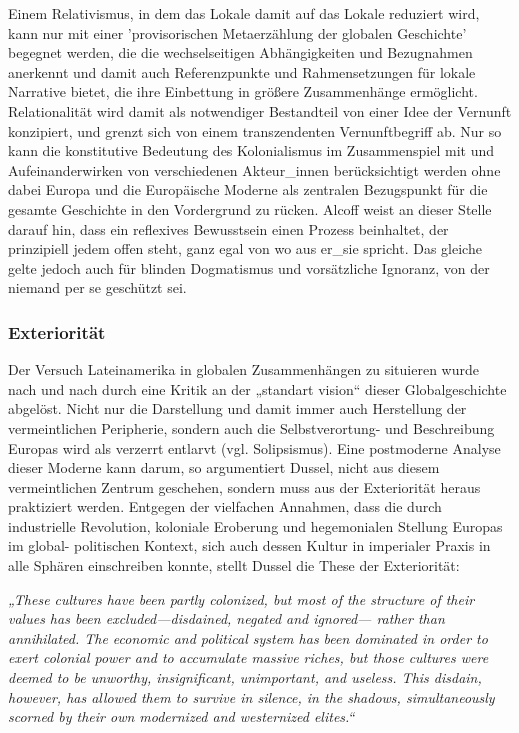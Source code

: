 Einem Relativismus, in dem das Lokale damit auf das Lokale reduziert wird, kann
nur mit einer 'provisorischen Metaerzählung der globalen Geschichte' begegnet
werden, die die wechselseitigen Abhängigkeiten und Bezugnahmen anerkennt und
damit auch Referenzpunkte und Rahmensetzungen für lokale Narrative bietet, die
ihre Einbettung in größere Zusammenhänge ermöglicht. Relationalität wird damit
als notwendiger Bestandteil von einer Idee der Vernunft konzipiert, und grenzt
sich von einem transzendenten Vernunftbegriff ab. Nur so kann die konstitutive
Bedeutung des Kolonialismus im Zusammenspiel mit und Aufeinanderwirken von
verschiedenen Akteur\_innen berücksichtigt werden ohne dabei Europa und die
Europäische Moderne als zentralen Bezugspunkt für die gesamte Geschichte in den
Vordergrund zu rücken. Alcoff weist an dieser Stelle darauf hin, dass ein
reflexives Bewusstsein einen Prozess beinhaltet, der prinzipiell jedem offen
steht, ganz egal von wo aus er\_sie spricht. Das gleiche gelte jedoch auch für
blinden Dogmatismus und vorsätzliche Ignoranz, von der niemand per se geschützt
sei.\footnotemark {}

\subsubsection{Exteriorität}

Der Versuch Lateinamerika in globalen Zusammenhängen zu situieren wurde nach und
nach durch eine Kritik an der „standart vision“\footnotemark {} dieser Globalgeschichte
abgelöst. Nicht nur die Darstellung und damit immer auch Herstellung der
vermeintlichen Peripherie, sondern auch die Selbstverortung- und Beschreibung
Europas wird als verzerrt entlarvt (vgl. Solipsismus).\footnotemark
{} Eine postmoderne Analyse
dieser Moderne kann darum, so argumentiert Dussel, nicht aus diesem
vermeintlichen Zentrum geschehen, sondern muss aus der Exteriorität heraus
praktiziert werden. Entgegen der vielfachen Annahmen, dass die durch
industrielle Revolution, koloniale Eroberung und hegemonialen Stellung Europas
im global- politischen Kontext, sich auch dessen Kultur in imperialer Praxis in alle Sphären einschreiben konnte, stellt Dussel die These der Exteriorität:
\begin{myenv} 
    \textit{„These cultures have been partly colonized, but most of the
    structure of their values has been excluded—disdained, negated and ignored—
    rather than annihilated. The economic and political system has been
    dominated in order to exert colonial power and to accumulate massive riches,
    but those cultures were deemed to be unworthy, insignificant, unimportant,
    and useless. This disdain, however, has allowed them to survive in silence,
in the shadows, simultaneously scorned by their own modernized and westernized
elites.“\footnotemark {}} \end{myenv}

